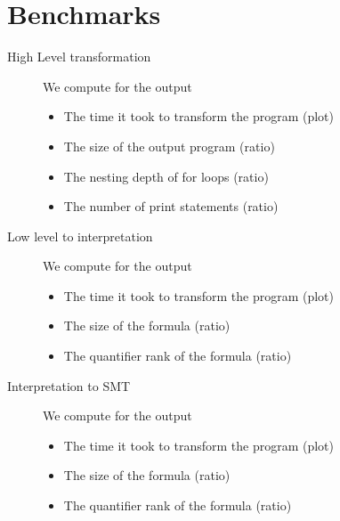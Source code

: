 \section{Benchmarks}
\label{sec:benchmarks}

\begin{description}
    \item[High Level transformation]
        We compute for the output
        \begin{itemize}
            \item The time it took to transform the program (plot)
            \item The size of the output program (ratio)
            \item The nesting depth of for loops (ratio)
            \item The number of print statements (ratio)
        \end{itemize}
    \item[Low level to interpretation]
        We compute for the output
        \begin{itemize}
            \item The time it took to transform the program (plot)
            \item The size of the formula (ratio)
            \item The quantifier rank of the formula (ratio)
        \end{itemize}
    \item[Interpretation to SMT]
        We compute for the output
        \begin{itemize}
            \item The time it took to transform the program (plot)
            \item The size of the formula (ratio)
            \item The quantifier rank of the formula (ratio)
        \end{itemize}
\end{description}
